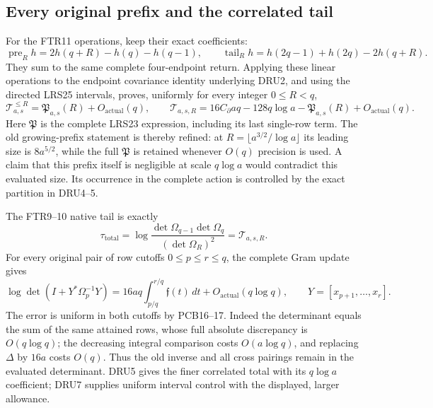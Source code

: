 \subsection{Every original prefix and the correlated tail}
For the FTR11 operations, keep their exact coefficients:
\[
 \operatorname{pre}_Rh=2h(q+R)-h(q)-h(q-1),\qquad
 \operatorname{tail}_Rh=h(2q-1)+h(2q)-2h(q+R).
 \tag{DRU4}
\]
They sum to the same complete four-endpoint return.  Applying these
linear operations to the endpoint covariance identity underlying DRU2,
and using the directed LRS25 intervals,
proves, uniformly for every integer $0\le R<q$,
\[
 \mathcal T_{a,s}^{\le R}=\mathfrak P_{a,s}(R)+O_{\mathrm{actual}}(q),
 \qquad
 \mathscr T_{a,s,R}=16C_\partial aq-128q\log a
                   -\mathfrak P_{a,s}(R)+O_{\mathrm{actual}}(q).
 \tag{DRU5}
\]
Here $\mathfrak P$ is the complete LRS23 expression, including its
last single-row term.  The old growing-prefix statement is thereby
refined: at $R=\lfloor a^{3/2}/\log a\rfloor$ its leading size is
$8a^{5/2}$, while the full $\mathfrak P$ is retained whenever
$O(q)$ precision is used.  A claim that this prefix itself is
negligible at scale $q\log a$ would contradict this evaluated size.
Its occurrence in the complete action is controlled by the exact
partition in DRU4--5.

The FTR9--10 native tail is exactly
\[
 \tau_{\mathrm{total}}
 =\log\frac{\det\Omega_{q-1}\det\Omega_q}{(\det\Omega_R)^2}
 =\mathscr T_{a,s,R}.
 \tag{DRU6}
\]
For every original pair of row cutoffs $0\le p\le r\le q$, the
complete Gram update gives
\[
 \log\det(I+Y^*\Omega_p^{-1}Y)
 =16aq\int_{p/q}^{r/q}\mathfrak f(t)\,dt
       +O_{\mathrm{actual}}(q\log q),\qquad
 Y=[x_{p+1},\ldots,x_r].
 \tag{DRU7}
\]
The error is uniform in both cutoffs by PCB16--17.  Indeed the
determinant equals the sum of the same attained rows, whose full
absolute discrepancy is $O(q\log q)$; the decreasing integral
comparison costs $O(a\log q)$, and replacing $\Delta$ by $16a$
costs $O(q)$.  Thus the old inverse and all cross pairings remain
in the evaluated determinant.  DRU5 gives the finer correlated
total with its $q\log a$ coefficient; DRU7 supplies uniform interval
control with the displayed, larger allowance.

